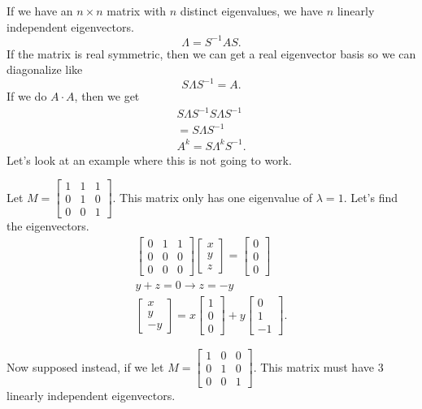 
If we have an $n\times n$ matrix with $n$ distinct eigenvalues, we have $n$ linearly independent eigenvectors. \[
\Lambda=S^{-1}AS
.\] 
If the matrix is real symmetric, then we can get a real eigenvector basis so we can diagonalize like \[
S\Lambda S^{-1}=A
.\] 
If we do $A\cdot A$, then we get 
\begin{align*}
  S\Lambda S^{-1}S\Lambda S^{-1}\\
  =S \Lambda S^{-1}\\
  A^{k}=S \Lambda ^{k}S^{-1}
.\end{align*}
Let's look at an example where this is not going to work. 
\begin{eg}
  Let $M=\begin{bmatrix} 1&1&1\\0&1&0\\0&0&1 \end{bmatrix} $. This matrix only has one eigenvalue of $\lambda=1$. Let's find the eigenvectors.
  \begin{align*}
    \begin{bmatrix} 0&1&1\\0&0&0\\0&0&0 \end{bmatrix} \begin{bmatrix} x\\y\\z \end{bmatrix} =\begin{bmatrix} 0\\0\\0 \end{bmatrix} \\
    y+z=0\to z=-y\\
    \begin{bmatrix} x\\y\\-y \end{bmatrix} =x\begin{bmatrix} 1\\0\\0 \end{bmatrix} +y\begin{bmatrix} 0\\1\\-1 \end{bmatrix} 
  .\end{align*}
\end{eg}
Now supposed instead, if we let $M=\begin{bmatrix} 1&0&0\\0&1&0\\0&0&1 \end{bmatrix} $. This matrix must have 3 linearly independent eigenvectors.
